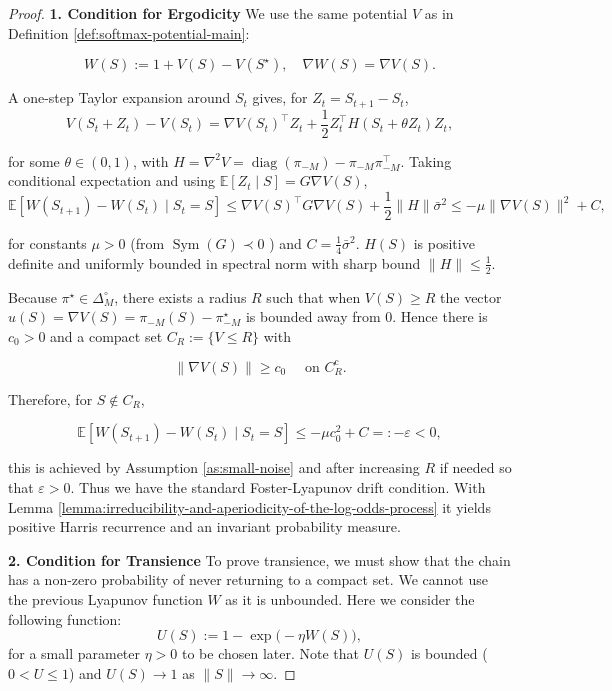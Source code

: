 \documentclass[12pt]{article}
\begin{document}
\begin{proof}
    \textbf{1. Condition for Ergodicity} We use the same potential $V$ as in Definition \ref{def:softmax-potential-main}:
    
    \[
    W(S):=1+V(S)-V\left(S^{\star}\right), \quad \nabla W(S)=\nabla V(S) .
    \]
    
    A one-step Taylor expansion around $S_t$ gives, for $Z_t=S_{t+1}-S_t$,
    \[
    V(S_t+Z_t)-V(S_t)=\nabla V(S_t)^{\top} Z_t+\frac{1}{2} Z_t^{\top} H(S_t+\theta Z_t) Z_t,
    \]
    
    for some $\theta \in(0,1)$, with $H=\nabla^2 V = \operatorname{diag}\left(\pi_{-M}\right)-\pi_{-M} \pi_{-M}^{\top}$. Taking conditional expectation and using $\mathbb{E}[Z_t \mid S]=G \nabla V(S)$,
    \[
    \mathbb{E}\left[W\left(S_{t+1}\right)-W\left(S_t\right) \mid S_t=S\right] \leq \nabla V(S)^{\top} G \nabla V(S) + \frac{1}{2}\|H\| \bar{\sigma}^2 \le  -\mu \|\nabla V(S)\|^2 +C,
    \]
    
    for constants $\mu>0$ (from $\operatorname{Sym}(G) \prec 0$ ) and $C=\frac{1}{4} \bar{\sigma}^2$. $H(S)$ is positive definite and uniformly bounded in spectral norm with sharp bound $\|H\|\le \frac{1}{2}$.
    
    Because $\pi^{\star} \in \Delta_M^{\circ}$, there exists a radius $R$ such that when $V(S) \geq R$ the vector $u(S)=\nabla V(S)= \pi_{-M}(S)-\pi_{-M}^{\star}$ is bounded away from 0. Hence there is $c_0>0$ and a compact set $C_R:=\{V \leq R\}$ with
    
    \[
    \|\nabla V(S)\| \geq c_0 \quad \text { on } C_R^{\mathrm{c}} .
    \]
    
    Therefore, for $S \notin C_R$,
    
    \[
    \mathbb{E}\left[W\left(S_{t+1}\right)-W\left(S_t\right) \mid S_t=S\right] \leq-\mu c_0^2+C=:-\varepsilon<0,
    \]
    
    this is achieved by Assumption \ref{as:small-noise} and after increasing $R$ if needed so that $\varepsilon>0$. Thus we have the standard Foster-Lyapunov drift condition. With Lemma \ref{lemma:irreducibility-and-aperiodicity-of-the-log-odds-process} it yields positive Harris recurrence and an invariant probability measure.
    
\textbf{2. Condition for Transience}
To prove transience, we must show that the chain has a non-zero probability of never returning to a compact set. We cannot use the previous Lyapunov function $W$ as it is unbounded. Here we consider the following function:
\[
U(S) := 1- \exp\big(-\eta W(S)\big),
\]
for a small parameter $\eta > 0$ to be chosen later. Note that $U(S)$ is bounded ($0 < U \le 1$) and $U(S) \to 1$ as $\|S\| \to \infty$.


\end{proof}
\end{document}
